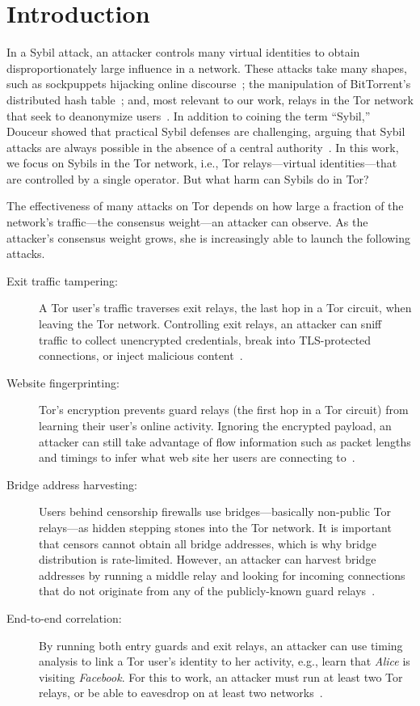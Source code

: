 \section{Introduction}
\label{sec:introduction}
In a Sybil attack, an attacker controls many virtual identities to obtain
disproportionately large influence in a network.  These attacks take many
shapes, such as sockpuppets hijacking online discourse~\cite{Thomas2012a}; the
manipulation of BitTorrent's distributed hash table~\cite{Wang2012a}; and, most
relevant to our work, relays in the Tor network that seek to deanonymize
users~\cite{cmucert}.  In addition to coining the term ``Sybil,'' Douceur showed
that practical Sybil defenses are challenging, arguing that Sybil attacks are
always possible in the absence of a central authority~\cite{Douceur2002a}.  In
this work, we focus on Sybils in the Tor network, i.e., Tor relays---virtual
identities---that are controlled by a single operator.  But what harm can Sybils
do in Tor?

The effectiveness of many attacks on Tor depends on how large a fraction of the
network's traffic---the consensus weight---an attacker can observe.  As the
attacker's consensus weight grows, she is increasingly able to launch the
following attacks.

\begin{description}
	\item[Exit traffic tampering:] A Tor user's traffic traverses exit relays,
		the last hop in a Tor circuit, when leaving the Tor network.
		Controlling exit relays, an attacker can sniff traffic to collect
		unencrypted credentials, break into TLS-protected connections, or inject
		malicious content~\cite{Winter2014a}.
	\item[Website fingerprinting:] Tor's encryption prevents guard relays (the
		first hop in a Tor circuit) from learning their user's online activity.
		Ignoring the encrypted payload, an attacker can still take advantage of
		flow information such as packet lengths and timings to infer what web
		site her users are connecting to~\cite{Juarez2014a}.
	\item[Bridge address harvesting:] Users behind censorship firewalls use
		bridges---basically non-public Tor relays---as hidden stepping stones
		into the Tor network.  It is important that censors cannot obtain all
		bridge addresses, which is why bridge distribution is rate-limited.
		However, an attacker can harvest bridge addresses by running a middle
		relay and looking for incoming connections that do not originate from
		any of the publicly-known guard relays~\cite{Ling2012a}.
	\item[End-to-end correlation:] By running both entry guards and exit relays,
		an attacker can use timing analysis to link a Tor user's identity to her
		activity, e.g., learn that \emph{Alice} is visiting \emph{Facebook}.
		For this to work, an attacker must run at least two Tor relays, or be
		able to eavesdrop on at least two networks~\cite{Johnson2013a}.
\end{description}

